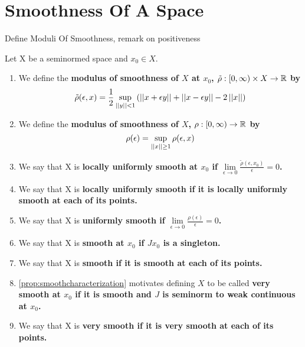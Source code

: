 
\section{Smoothness Of A Space} 
Define Moduli Of Smoothness, remark on positiveness %
\begin{df} %
    Let X be a seminormed space and $x_0 \in X$. 
    \begin{enumerate}
        \item We define the \bf modulus of smoothness \rm of $X$ at $x_0$, $\tilde{\rho}:[0,\infty) \times X \to \mathbb{R}$ by 
        \begin{equation}
            \tilde{\rho}(\epsilon,x) = \frac{1}{2} \sup\limits_{\left|\left| y \right|\right| < 1} \left( \left|\left| x+\epsilon y \right|\right|+\left|\left| x-\epsilon y \right|\right| -2\left|\left| x \right|\right|\right)
        \end{equation}
        \item We define the \bf modulus of smoothness \rm of $X$, $\rho:[0,\infty) \to \mathbb{R}$ by 
        \begin{equation}
            \rho(\epsilon) = \sup\limits_{\left|\left| x \right|\right| \geq 1} \rho(\epsilon, x)
        \end{equation}
        \item We say that X is \bf locally uniformly smooth \rm at $x_0$ if $\lim\limits_{\epsilon \to 0} \frac{\tilde{\rho}(\epsilon,x_0)}{\epsilon} = 0$. 
        \item We say that X is \bf locally uniformly smooth \rm if it is locally uniformly smooth at each of its points.
        \item We say that X is \bf uniformly smooth \rm if $\lim\limits_{\epsilon \to 0} \frac{\rho(\epsilon)}{\epsilon} = 0$. 
        \item  We say that X is \bf smooth \rm at $x_0$ if $Jx_0$ is a singleton.
        \item We say that X is \bf smooth \rm if it is smooth at each of its points.
        \item \ref{prop:smoothcharacterization} motivates defining $X$ to be called \bf very smooth \rm  at $x_0$ if it is smooth and $J$ is seminorm to weak continuous at $x_0$. 
        \item We say that X is \bf very smooth \rm if it is very smooth at each of its points. 
    \end{enumerate} 
\end{df}



